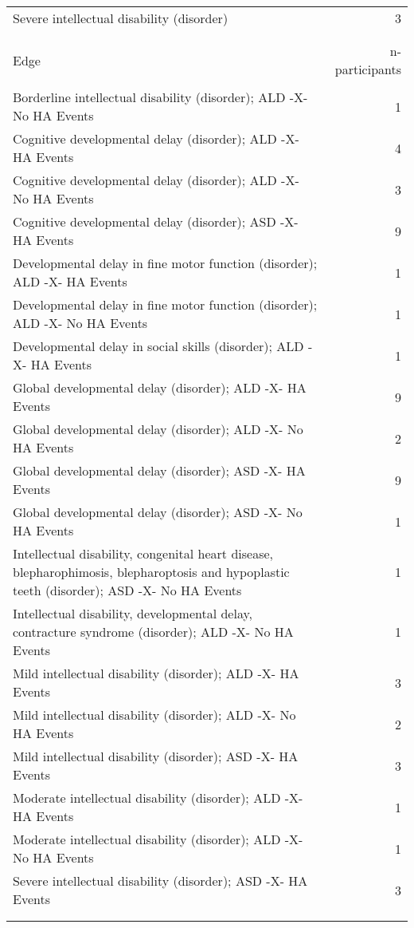\documentclass[10pt, letterpaper]{article}
\begin{document}
\begin{spacing}{1.0}
\begin{small}
\begin{longtable}[H]{p{5in}r}
        \rowcolor{ltBlue}
        Severe intellectual disability (disorder) & 3 \\
        &\\[-6pt]
        \hline\\[-8pt]
        Edge & n-participants\\
        \hline\\[-6pt]
        Borderline intellectual disability (disorder); ALD -X- No HA Events & 1 \\
        \rowcolor{ltBlue}
        Cognitive developmental delay (disorder); ALD -X- HA Events & 4 \\
        Cognitive developmental delay (disorder); ALD -X- No HA Events & 3 \\
        \rowcolor{ltBlue}
        Cognitive developmental delay (disorder); ASD -X- HA Events & 9 \\
        Developmental delay in fine motor function (disorder); ALD -X- HA Events & 1 \\
        \rowcolor{ltBlue}
        Developmental delay in fine motor function (disorder); ALD -X- No HA Events & 1 \\
        Developmental delay in social skills (disorder); ALD -X- HA Events & 1 \\
        \rowcolor{ltBlue}
        Global developmental delay (disorder); ALD -X- HA Events & 9 \\
        Global developmental delay (disorder); ALD -X- No HA Events & 2 \\
        \rowcolor{ltBlue}
        Global developmental delay (disorder); ASD -X- HA Events & 9 \\
        Global developmental delay (disorder); ASD -X- No HA Events & 1 \\
        \rowcolor{ltBlue}
        Intellectual disability, congenital heart disease, blepharophimosis, blepharoptosis and hypoplastic teeth (disorder); ASD -X- No HA Events & 1 \\
        Intellectual disability, developmental delay, contracture syndrome (disorder); ALD -X- No HA Events & 1 \\
        \rowcolor{ltBlue}
        Mild intellectual disability (disorder); ALD -X- HA Events & 3 \\
        Mild intellectual disability (disorder); ALD -X- No HA Events & 2 \\
        \rowcolor{ltBlue}
        Mild intellectual disability (disorder); ASD -X- HA Events & 3 \\
        Moderate intellectual disability (disorder); ALD -X- HA Events & 1 \\
        \rowcolor{ltBlue}
        Moderate intellectual disability (disorder); ALD -X- No HA Events & 1 \\
        Severe intellectual disability (disorder); ASD -X- HA Events & 3 \\
        & \\[-6pt]
        \hline
        \label{tab:ID-Dx-HA-01}
    \end{longtable}
\end{small}


\end{spacing}
\end{document}
